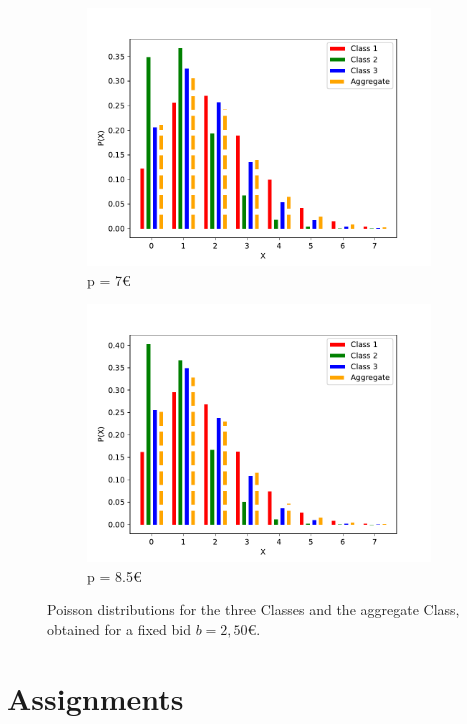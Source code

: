 \documentclass[12pt,a4paper]{report}
\begin{document}
\begin{figure}[H]
\begin{subfigure}{.49\textwidth}
  \includegraphics[width=1\linewidth]{7e}
  \caption{p = 7\euro}
  \label{fig:sub3}
\end{subfigure}
\begin{subfigure}{.49\textwidth}
  \centering
  \includegraphics[width=1\linewidth]{85e}
  \caption{p = 8.5\euro}
  \label{fig:sub4}
\end{subfigure}
	\caption{Poisson distributions for the three Classes and the aggregate Class, obtained for a fixed bid $b=2,50$\euro.}
\end{figure}


	\chapter{Assignments}
\end{document}
